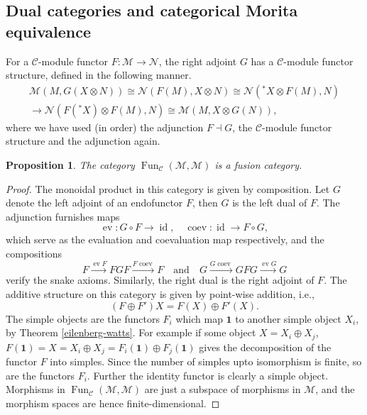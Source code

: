 \documentclass[11pt]{book}
\newtheorem{Prop}[theorem]{Proposition}
\theoremstyle{Rem}
\theoremstyle{definition}
\numberwithin{equation}{section}
\newcommand\id{\operatorname{id}}
\newcommand\Fun{\operatorname{Fun}}
\newcommand\M{\mathcal{M}}
\newcommand\NN{\mathcal{N}}
\newcommand\C{\mathcal C}
\newcommand{\ra}\rightarrow
\newcommand{\xra}\xrightarrow
\newcommand\one{\mathbf{1}}
\newcommand\ev{\operatorname{ev}}
\newcommand\coev{\operatorname{coev}}
\begin{document}
\subsection{Dual categories and categorical Morita equivalence}
For a $\C$-module functor $F:\M\rightarrow \NN$, the right adjoint $G$ has a $\C$-module functor structure, defined in the following manner. \begin{align}
	\M(M, G(X\otimes N))\cong {\NN}(F(M), X\otimes N) \cong {\NN}({}^*X \otimes F(M), N) \\ \xrightarrow{~} \NN(F({}^*X)\otimes F(M), N) \cong \M(M, X\otimes G(N)),
\end{align}
where we have used (in order) the adjunction $F\dashv G$, the $\C$-module functor structure and the adjunction again. 
\begin{Prop}\label{dualfusion}
The category $\Fun_\C(\M, \M)$ is a fusion category.
\end{Prop}
\begin{proof}
The monoidal product in this category is given by composition. Let $G$ denote the left adjoint of an endofunctor $F$, then $G$ is the left dual of $F$. The adjunction furnishes maps \begin{equation}
	\ev:G\circ F \ra \id, \quad \coev:\id\ra F\circ G,
\end{equation} which serve as the evaluation and coevaluation map respectively, and the compositions \begin{equation}
	F\xra{\ev F} FGF \xra{F\coev} F\quad \text{and}\quad  G\xra{G\coev}GFG\xra{\ev G}G
\end{equation}verify the snake axioms. Similarly, the right dual is the right adjoint of $F$. The additive structure on this category is given by point-wise addition, i.e., \begin{equation}
	(F\oplus F') X = F(X) \oplus F'(X).	
\end{equation} The simple objects are the functors $F_i$ which map $\one$ to another simple object $X_i$, by Theorem \ref{eilenberg-watts}. For example if some object $X= X_i \oplus X_j$, $F(\one) = X = X_i \oplus X_j = F_i(\one) \oplus F_j(\one)$ gives the decomposition of the functor $F$ into simples. Since the number of simples upto isomorphism is finite, so are the functors $F_i$. Further the identity functor is clearly a simple object. Morphisms in $\Fun_\C(\M, \M)$ are just a subspace of morphisms in $\M$, and the morphism spaces are hence finite-dimensional.
\end{proof}
\end{document}
